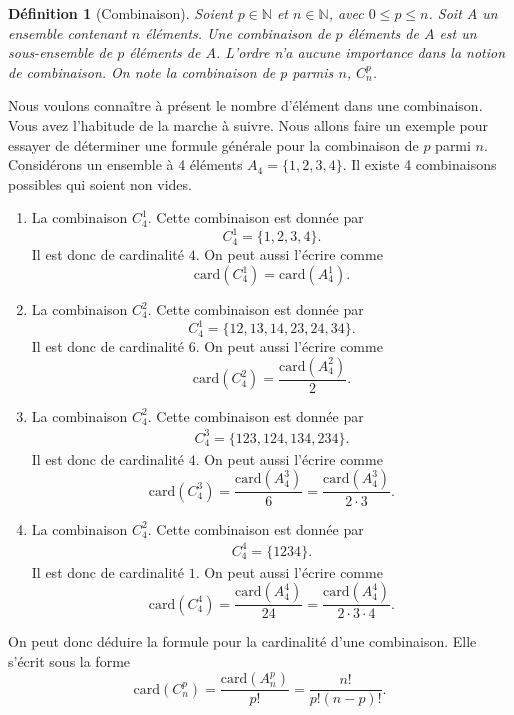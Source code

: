 \documentclass[a4paper,12pt]{book}
\renewcommand{\natural}{\mathbb{N}}
\newcommand{\card}{\mathrm{card}}
\newtheorem{definition}{Définition}
\begin{document}
\begin{definition}[Combinaison]
Soient $p\in \natural$ et $n\in \natural$, avec $0\leq p\leq n$. Soit $A$ un ensemble
contenant $n$ éléments. Une combinaison de $p$ éléments de $A$ est un sous-ensemble de $p$ éléments de $A$. L'ordre n'a aucune importance dans la notion de combinaison.
On note la combinaison de $p$ parmis $n$, $C_n^p$.
\end{definition}
Nous voulons connaître à présent le nombre d'élément dans une combinaison. Vous avez l'habitude de la marche à suivre. Nous allons faire un exemple pour essayer de
déterminer une formule générale pour la combinaison de $p$ parmi $n$.
Considérons un ensemble à 4 éléments $A_4=\{1,2,3,4\}$. Il existe
4 combinaisons possibles qui soient non vides.
\begin{enumerate}
 \item La combinaison $C_4^1$. Cette combinaison est donnée par
 \begin{equation*}
 C_4^1=\{1,2,3,4\}. 
 \end{equation*}
 Il est donc de cardinalité $4$. On peut aussi l'écrire comme 
 \begin{equation*}
 \card(C_4^1)=\card(A_4^1). 
 \end{equation*}
 \item La combinaison $C_4^2$. Cette combinaison est donnée par
 \begin{equation*}
 C_4^1=\{12, 13, 14, 23, 24, 34\}. 
 \end{equation*}
 Il est donc de cardinalité $6$. On peut aussi l'écrire comme 
 \begin{equation*}
 \card(C_4^2)=\frac{\card(A_4^2)}{2}. 
 \end{equation*}
 
 \item La combinaison $C_4^2$. Cette combinaison est donnée par
 \begin{align*}
 C_4^3=\{123, 124, 134, 234\}. 
 \end{align*}
 Il est donc de cardinalité $4$. On peut aussi l'écrire comme 
 \begin{equation*}
 \card(C_4^3)=\frac{\card(A_4^3)}{6}=\frac{\card(A_4^3)}{2\cdot 3}. 
 \end{equation*}
 \item La combinaison $C_4^2$. Cette combinaison est donnée par
 \begin{align*}
 C_4^4=\{1234\}. 
 \end{align*}
 Il est donc de cardinalité $1$.  On peut aussi l'écrire comme 
 \begin{equation*}
 \card(C_4^4)=\frac{\card(A_4^4)}{24}=\frac{\card(A_4^4)}{2\cdot 3\cdot 4}. 
 \end{equation*}
\end{enumerate}
On peut donc déduire la formule pour la cardinalité d'une combinaison. 
Elle s'écrit sous la forme
\begin{equation}
 \card(C_n^p)=\frac{\card(A_n^p)}{p!}=\frac{n!}{p!(n-p)!}.
\end{equation}
\end{document}
